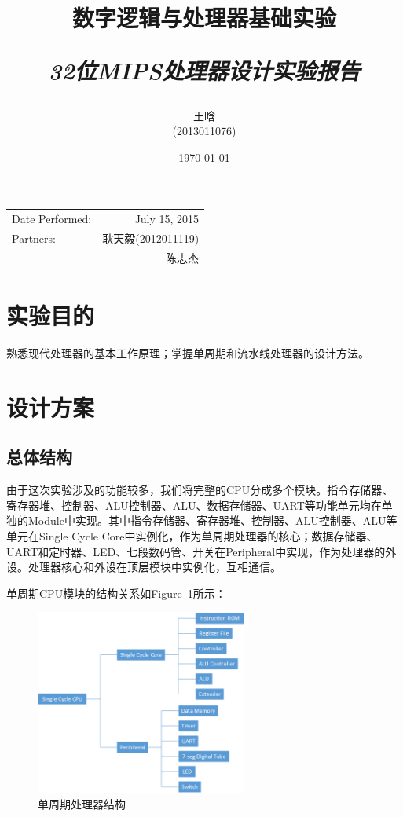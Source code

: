 \documentclass{article}
\title{\textbf{数字逻辑与处理器基础实验} \\ [2ex] \begin{large} \emph{32位MIPS处理器设计实验报告} \end{large} }
\author{王晗 \\ (2013011076)}
\date{\today}
\begin{document}
    \maketitle

    \begin{table}[htb]
        \centering
        \begin{tabular}{lr}
            Date Performed: & July 15, 2015 \\
            Partners:   & 耿天毅(2012011119) \\
                        & 陈志杰 \fbox{\begin{small}\emph{~~withdrawn~~}\end{small}} \\
        \end{tabular}
    \end{table}

    \section{实验目的}
        熟悉现代处理器的基本工作原理；掌握单周期和流水线处理器的设计方法。

    \section{设计方案}
        \subsection{总体结构}
            由于这次实验涉及的功能较多，我们将完整的CPU分成多个模块。指令存储器、寄存器堆、控制器、ALU控制器、ALU、数据存储器、UART等功能单元均在单独的Module中实现。其中指令存储器、寄存器堆、控制器、ALU控制器、ALU等单元在Single Cycle Core中实例化，作为单周期处理器的核心；数据存储器、UART和定时器、LED、七段数码管、开关在Peripheral中实现，作为处理器的外设。处理器核心和外设在顶层模块中实例化，互相通信。

            单周期CPU模块的结构关系如Figure~\ref{fig:singlecycle}所示：
            \begin{figure}[H]
                    \centering
                    \includegraphics[width=0.62\textwidth]{images/singlecycle.png}
                    \caption{\label{fig:singlecycle}单周期处理器结构}
                \end{figure}
\end{document}
